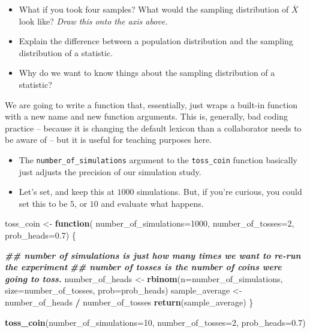 \documentclass[
]{book}
\newenvironment{Shaded}{\begin{snugshade}}{\end{snugshade}}
\newcommand{\AttributeTok}[1]{\textcolor[rgb]{0.13,0.29,0.53}{#1}}
\newcommand{\ControlFlowTok}[1]{\textcolor[rgb]{0.13,0.29,0.53}{\textbf{#1}}}
\newcommand{\DecValTok}[1]{\textcolor[rgb]{0.00,0.00,0.81}{#1}}
\newcommand{\DocumentationTok}[1]{\textcolor[rgb]{0.56,0.35,0.01}{\textbf{\textit{#1}}}}
\newcommand{\FloatTok}[1]{\textcolor[rgb]{0.00,0.00,0.81}{#1}}
\newcommand{\FunctionTok}[1]{\textcolor[rgb]{0.13,0.29,0.53}{\textbf{#1}}}
\newcommand{\NormalTok}[1]{#1}
\newcommand{\OtherTok}[1]{\textcolor[rgb]{0.56,0.35,0.01}{#1}}
\newcommand{\SpecialCharTok}[1]{\textcolor[rgb]{0.81,0.36,0.00}{\textbf{#1}}}
\providecommand{\tightlist}{%
  \setlength{\itemsep}{0pt}\setlength{\parskip}{0pt}}
\theoremstyle{definition}
\theoremstyle{definition}
\theoremstyle{definition}
\theoremstyle{definition}
\theoremstyle{remark}
\begin{document}
\begin{itemize}
\tightlist
\item
  What if you took four samples? What would the sampling distribution of \(\overline{X}\) look like? \emph{Draw this onto the axis above.}
\item
  Explain the difference between a population distribution and the sampling distribution of a statistic.
\item
  Why do we want to know things about the sampling distribution of a statistic?
\end{itemize}

We are going to write a function that, essentially, just wraps a built-in function with a new name and new function arguments. This is, generally, bad coding practice -- because it is changing the default lexicon than a collaborator needs to be aware of -- but it is useful for teaching purposes here.

\begin{itemize}
\tightlist
\item
  The \texttt{number\_of\_simulations} argument to the \texttt{toss\_coin} function basically just adjusts the precision of our simulation study.
\item
  Let's set, and keep this at \(1000\) simulations. But, if you're curious, you could set this to be \(5\), or \(10\) and evaluate what happens.
\end{itemize}

\begin{Shaded}
\begin{Highlighting}[]
\NormalTok{toss\_coin }\OtherTok{\textless{}{-}} \ControlFlowTok{function}\NormalTok{(}
    \AttributeTok{number\_of\_simulations=}\DecValTok{1000}\NormalTok{, }
    \AttributeTok{number\_of\_tosses=}\DecValTok{2}\NormalTok{, }
    \AttributeTok{prob\_heads=}\FloatTok{0.7}\NormalTok{) \{ }
  
  \DocumentationTok{\#\# number of simulations is just how many times we want to re{-}run the experiment}
  \DocumentationTok{\#\# number of tosses is the number of coins we\textquotesingle{}re going to toss.}
\NormalTok{  number\_of\_heads }\OtherTok{\textless{}{-}} \FunctionTok{rbinom}\NormalTok{(}\AttributeTok{n=}\NormalTok{number\_of\_simulations, }\AttributeTok{size=}\NormalTok{number\_of\_tosses, }\AttributeTok{prob=}\NormalTok{prob\_heads)}
\NormalTok{  sample\_average  }\OtherTok{\textless{}{-}}\NormalTok{ number\_of\_heads }\SpecialCharTok{/}\NormalTok{ number\_of\_tosses}
  \FunctionTok{return}\NormalTok{(sample\_average)}
\NormalTok{\}}

\FunctionTok{toss\_coin}\NormalTok{(}\AttributeTok{number\_of\_simulations=}\DecValTok{10}\NormalTok{, }\AttributeTok{number\_of\_tosses=}\DecValTok{2}\NormalTok{, }\AttributeTok{prob\_heads=}\FloatTok{0.7}\NormalTok{)}
\end{Highlighting}
\end{Shaded}
\end{document}
